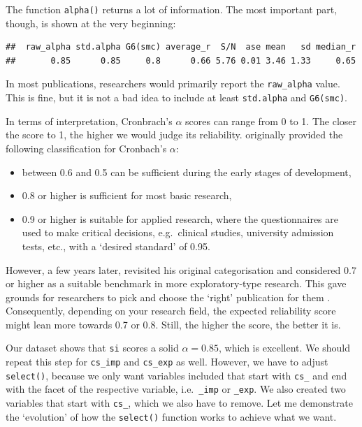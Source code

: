 \documentclass[
]{book}
\begin{document}
The function \texttt{alpha()} returns a lot of information. The most important part, though, is shown at the very beginning:

\begin{verbatim}
##  raw_alpha std.alpha G6(smc) average_r  S/N  ase mean   sd median_r
##       0.85      0.85     0.8      0.66 5.76 0.01 3.46 1.33     0.65
\end{verbatim}

In most publications, researchers would primarily report the \texttt{raw\_alpha} value. This is fine, but it is not a bad idea to include at least \texttt{std.alpha} and \texttt{G6(smc)}.

In terms of interpretation, Cronbrach's \(\alpha\) scores can range from 0 to 1. The closer the score to 1, the higher we would judge its reliability. \citet{nunally-1967} originally provided the following classification for Cronbach's \(\alpha\):

\begin{itemize}
\item
  between 0.6 and 0.5 can be sufficient during the early stages of development,
\item
  0.8 or higher is sufficient for most basic research,
\item
  0.9 or higher is suitable for applied research, where the questionnaires are used to make critical decisions, e.g.~clinical studies, university admission tests, etc., with a `desired standard' of 0.95.
\end{itemize}

However, a few years later, \citet{nunally-1978} revisited his original categorisation and considered 0.7 or higher as a suitable benchmark in more exploratory-type research. This gave grounds for researchers to pick and choose the `right' publication for them \citep{henson2001understanding}. Consequently, depending on your research field, the expected reliability score might lean more towards 0.7 or 0.8. Still, the higher the score, the better it is.

Our dataset shows that \texttt{si} scores a solid \(\alpha = 0.85\), which is excellent. We should repeat this step for \texttt{cs\_imp} and \texttt{cs\_exp} as well. However, we have to adjust \texttt{select()}, because we only want variables included that start with \texttt{cs\_} and end with the facet of the respective variable, i.e.~\texttt{\_imp} or \texttt{\_exp}. We also created two variables that start with \texttt{cs\_}, which we also have to remove. Let me demonstrate the `evolution' of how the \texttt{select()} function works to achieve what we want.
\end{document}
